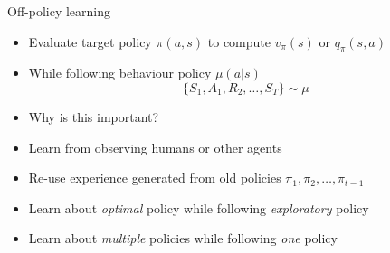 \bgroup
\begin{frame}{Off-policy learning}
\begin{itemize}
\item Evaluate target policy $\pi(a,s)$ to compute $v_{\pi}(s)$ or $q_{\pi}(s, a)$
\item While following behaviour policy $\mu(a|s)$
\begin{equation*}
\{S_1, A_1, R_2, \ldots, S_T\} \sim \mu
\end{equation*}
\item Why is this important?
\item Learn from observing humans or other agents
\item Re-use experience generated from old policies $\pi_1, \pi_2, \ldots, \pi_{t-1}$
\item Learn about \emph{optimal} policy while following \emph{exploratory} policy
\item Learn about \emph{multiple} policies while following \emph{one} policy
\end{itemize}
\end{frame}
\egroup